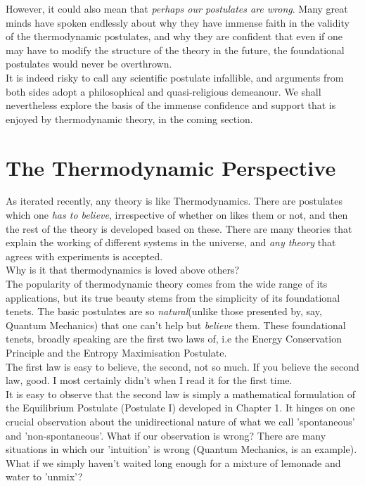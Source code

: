 \documentclass[oneside]{book}
\begin{document}
However, it could also mean that \emph{perhaps our postulates are wrong}. Many great minds have spoken endlessly about why they have immense faith in the validity of the thermodynamic postulates, and why they are confident that even if one may have to modify the structure of the theory in the future, the foundational postulates would never be overthrown.\\

It is indeed risky to call any scientific postulate infallible, and arguments from both sides adopt a philosophical and quasi-religious demeanour. We shall nevertheless explore the basis of the immense confidence and support that is enjoyed by thermodynamic theory, in the coming section.


\section{The Thermodynamic Perspective}
As iterated recently, any theory is like Thermodynamics. There are postulates which one \emph{has to believe}, irrespective of whether on likes them or not, and then the rest of the theory is developed based on these. There are many theories that explain the working of different systems in the universe, and \emph{any theory} that agrees with experiments is accepted.\\


Why is it that thermodynamics is loved above others?\\

The popularity of thermodynamic theory comes from the wide range of its applications, but its true beauty stems from the simplicity of its foundational tenets. The basic postulates are so \emph{natural}(unlike those presented by, say, Quantum Mechanics) that one can't help but \emph{believe} them. These foundational tenets, broadly speaking are the first two laws of, i.e the Energy Conservation Principle and the Entropy Maximisation Postulate.\\

The first law is easy to believe, the second, not so much. If you believe the second law, good. I most certainly didn’t when I read it for the first time.\\

It is easy to observe that the second law is simply a mathematical formulation of the Equilibrium Postulate (Postulate I) developed in Chapter 1. It hinges on one crucial observation about the unidirectional nature of what we call 'spontaneous' and 'non-spontaneous'. What if our observation is wrong? There are many situations in which our 'intuition' is wrong (Quantum Mechanics, is an example). What if we simply haven't waited long enough for a mixture of lemonade and water to 'unmix'?\\
\end{document}
